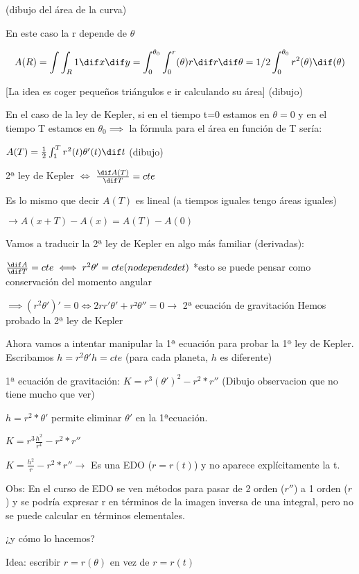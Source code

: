 (dibujo del área de la curva)

En este caso la r depende de $\theta$ 

$$A(R) = \int\int_R 1 \dif x \dif y = \int_0^{\theta_0} \int_0^r(\theta) r \dif r \dif \theta = 1/2 \int_0^{\theta_0} r^2(\theta) \dif(\theta)$$

[La idea es coger pequeños triángulos e ir calculando su área]
(dibujo)

En el caso de la ley de Kepler, si en el tiempo t=0 estamos en $\theta = 0$ y en el tiempo T estamos en $\theta_0 \implies$ la fórmula para el área en función de T sería:

$A(T) = \frac{1}{2} \int_1^T r^2(t) \theta'(t) \dif t$
(dibujo)

2ª ley de Kepler $\iff$ $\frac {\dif A(T)}{\dif T} = cte$

Es lo mismo que decir $A(T)$ es lineal (a tiempos iguales tengo áreas iguales)

$\rightarrow  A(x + T) - A(x) = A(T) - A(0)$

Vamos a traducir la 2ª ley de Kepler en algo más familiar (derivadas):

$\frac{\dif A}{\dif T} = cte \iff r^2\theta' = cte  (no depende de t)$
*esto se puede pensar como conservación del momento angular

$\implies (r^2\theta')' = 0 \iff 2rr'\theta' + r²\theta'' =0 \rightarrow$ 2ª ecuación de gravitación
Hemos probado la 2ª ley de Kepler

Ahora vamos a intentar manipular la 1ª ecuación para probar la 1ª ley de Kepler.
Escribamos $h= r^2\theta'  h=cte$ (para cada planeta, $h$ es diferente)

1ª ecuación de gravitación:
$K= r^3(\theta')^2 -r^2*r''$
(Dibujo observacion que no tiene mucho que ver)

$h = r^2*\theta'$ permite eliminar $\theta'$ en la 1ªecuación.

$K= r^3 \frac{h^2}{r^4} - r^2*r''$

$K= \frac{h^2}{r} - r^2*r''  \rightarrow$  Es una EDO ($r = r(t)$) y no aparece explícitamente la t.

Obs: En el curso de EDO se ven métodos para pasar de 2 orden ($r''$) a 1 orden ($r$) y se podría expresar r en términos de la imagen inversa de una integral, pero no se puede calcular en términos elementales.

¿y cómo lo hacemos?

Idea: escribir $r=r(\theta)$ en vez de $r=r(t)$










